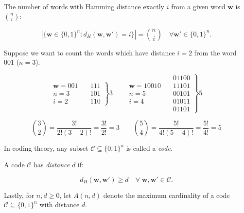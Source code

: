 \begin{proposition}
    The number of words with Hamming distance exactly $i$ from a given word $\mathbf{w}$ is ${ n \choose i }$:

    \begin{equation}
        |\{ \mathbf{w} \in \{0,1\}^n : d_H(\mathbf{w},\mathbf{w}') = i\}| = {n \choose i}\quad \forall \mathbf{w'} \in \{0,1\}^n.
    \end{equation}
\end{proposition}
\begin{example}
    Suppose we want to count the words which have distance $i=2$ from the word $001$ ($n=3$).
    
    \begin{equation*}
        \begin{aligned}
            \mathbf{w} = 001 \\
            n = 3 \\
            i = 2 
        \end{aligned}
        \quad
        \left.\begin{aligned}
            111\\
            101\\
            110
        \end{aligned}
        \right\} 3
        \quad\quad
        \begin{aligned}
            \mathbf{w} = 10010 \\
            n = 5 \\
            i = 4
        \end{aligned}
        \quad
        \left.\begin{aligned}
            01100\\
            11101\\
            00101\\
            01011\\
            01101
        \end{aligned}
        \right\} 5
    \end{equation*}

    \begin{equation*}
        {3 \choose 2} = \frac{3!}{2!(3-2)!}=\frac{3!}{2!}=3
        \quad\quad
        {5 \choose 4} = \frac{5!}{4!(5-4)!}=\frac{5!}{4!}=5
    \end{equation*}

\end{example}

\begin{definition}
In coding theory, any subset $\mathcal{C} \subseteq \{0,1\}^n$ is called a \emph{code}.

A code $\mathcal{C}$ has \emph{distance} $d$ if:

\begin{equation}
    d_H(\textbf{w}, \textbf{w}') \geq d \quad \forall \;\textbf{w}, \textbf{w}' \in \mathcal{C}.
\end{equation}

Lastly, for $n, d \geq 0$, let $A(n,d)$ denote the maximum cardinality of a code $\mathcal{C} \subseteq \{0,1\}^n$ with distance $d$.
\end{definition}

